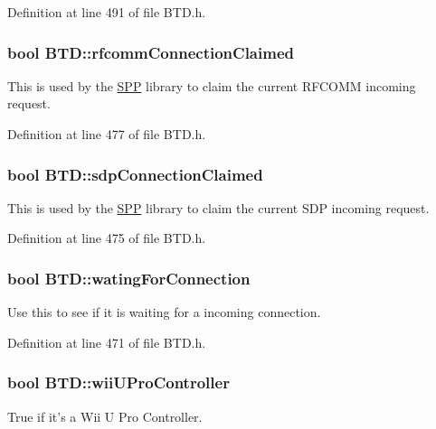 \-Definition at line 491 of file \-B\-T\-D.\-h.

\hypertarget{class_b_t_d_a9e5a34242007b64cd6a226cfd1901e74}{
\subsubsection[{rfcomm\-Connection\-Claimed}]{\setlength{\rightskip}{0pt plus 5cm}bool {\bf \-B\-T\-D\-::rfcomm\-Connection\-Claimed}}}\label{class_b_t_d_a9e5a34242007b64cd6a226cfd1901e74}
\-This is used by the \hyperlink{class_s_p_p}{\-S\-P\-P} library to claim the current \-R\-F\-C\-O\-M\-M incoming request. 

\-Definition at line 477 of file \-B\-T\-D.\-h.

\hypertarget{class_b_t_d_af5e5b085cec1da5c83c75e80e95b3590}{
\subsubsection[{sdp\-Connection\-Claimed}]{\setlength{\rightskip}{0pt plus 5cm}bool {\bf \-B\-T\-D\-::sdp\-Connection\-Claimed}}}\label{class_b_t_d_af5e5b085cec1da5c83c75e80e95b3590}
\-This is used by the \hyperlink{class_s_p_p}{\-S\-P\-P} library to claim the current \-S\-D\-P incoming request. 

\-Definition at line 475 of file \-B\-T\-D.\-h.

\hypertarget{class_b_t_d_aa7735da01865bab01b569ee836173737}{
\subsubsection[{wating\-For\-Connection}]{\setlength{\rightskip}{0pt plus 5cm}bool {\bf \-B\-T\-D\-::wating\-For\-Connection}}}\label{class_b_t_d_aa7735da01865bab01b569ee836173737}
\-Use this to see if it is waiting for a incoming connection. 

\-Definition at line 471 of file \-B\-T\-D.\-h.

\hypertarget{class_b_t_d_a962a5714c225dcb633434f02e3657583}{
\subsubsection[{wii\-U\-Pro\-Controller}]{\setlength{\rightskip}{0pt plus 5cm}bool {\bf \-B\-T\-D\-::wii\-U\-Pro\-Controller}}}\label{class_b_t_d_a962a5714c225dcb633434f02e3657583}
\-True if it's a \-Wii \-U \-Pro \-Controller. 


